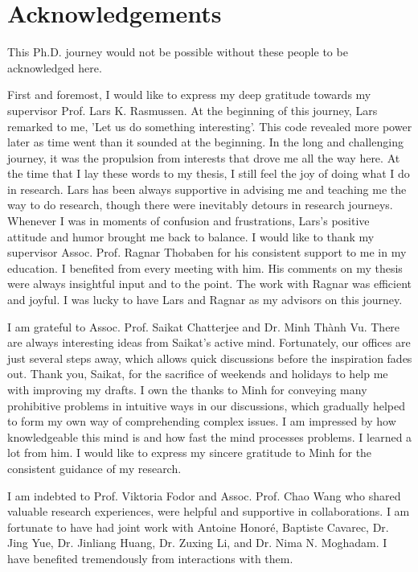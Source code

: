 \chapter{Acknowledgements}
This Ph.D. journey would not be possible without these people to be acknowledged here.

First and foremost, I would like to express my deep gratitude towards my supervisor Prof. Lars K. Rasmussen. At the beginning of this journey, Lars remarked to me, 'Let us do something interesting'. This code revealed more power later as time went than it sounded at the beginning. In the long and challenging journey, it was the propulsion from interests that drove me all the way here. At the time that I lay these words to my thesis, I still feel the joy of doing what I do in research. Lars has been always supportive in advising me and teaching me the way to do research, though there were inevitably detours in research journeys. Whenever I was in moments of confusion and frustrations, Lars's positive attitude and humor brought me back to balance.
I would like to thank my supervisor Assoc. Prof. Ragnar Thobaben for his consistent support to me in my education. I benefited from every meeting with him. His comments on my thesis were always insightful input and to the point. The work with Ragnar was efficient and joyful. I was lucky to have Lars and Ragnar as my advisors on this journey.

I am grateful to Assoc. Prof. Saikat Chatterjee and Dr. Minh Th\`{a}nh Vu. There are always interesting ideas from Saikat's active mind. Fortunately, our offices are just several steps away, which allows quick discussions before the inspiration fades out. Thank you, Saikat, for the sacrifice of weekends and holidays to help me with improving my drafts.
I own the thanks to Minh for conveying many prohibitive problems in intuitive ways in our discussions, which gradually helped to form my own way of comprehending complex issues. I am impressed by how knowledgeable this mind is and how fast the mind processes problems. I learned a lot from him. I would like to express my sincere gratitude to Minh for the consistent guidance of my research.

I am indebted to Prof. Viktoria Fodor and Assoc. Prof. Chao Wang who shared valuable research experiences, were helpful and supportive in collaborations. I am fortunate to have had joint work with Antoine Honor{\'e}, Baptiste Cavarec, Dr. Jing Yue, Dr. Jinliang Huang, Dr. Zuxing Li, and Dr. Nima N. Moghadam. I have benefited tremendously from interactions with them.

